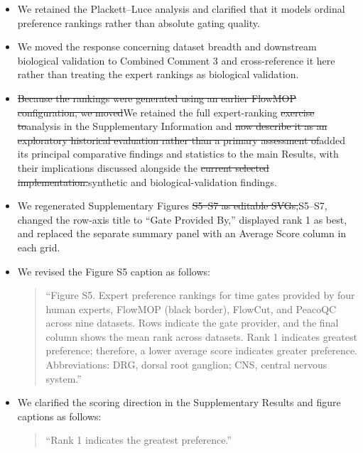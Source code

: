 \documentclass[
  11pt,
  a4paper,
]{article}
\begin{document}
\begin{itemize}
\item
  We retained the Plackett--Luce analysis and clarified that it models
  ordinal preference rankings rather than absolute gating quality.
\item
  We moved the response concerning dataset breadth and downstream
  biological validation to Combined Comment 3 and cross-reference it
  here rather than treating the expert rankings as biological
  validation.
\item
  {\color{revisionred}\sout{Because the rankings were generated using an
  earlier FlowMOP configuration, we moved}}{\color{revisionblue}We
  retained} the {\color{revisionblue}full} expert-ranking
  {\color{revisionred}\sout{exercise to}}{\color{revisionblue}analysis
  in} the Supplementary Information and {\color{revisionred}\sout{now
  describe it as an exploratory historical evaluation rather than a
  primary assessment of}}{\color{revisionblue}added its principal
  comparative findings and statistics to the main Results, with their
  implications discussed alongside} the
  {\color{revisionred}\sout{current selected
  implementation.}}{\color{revisionblue}synthetic and
  biological-validation findings.}
\item
  We regenerated Supplementary Figures {\color{revisionred}\sout{S5--S7
  as editable SVGs,}}{\color{revisionblue}S5--S7,} changed the row-axis
  title to ``Gate Provided By,'' displayed rank 1 as best, and replaced
  the separate summary panel with an Average Score column in each grid.
\item
  We revised the Figure S5 caption as follows:

  \begin{quote}
  ``Figure S5. Expert preference rankings for time gates provided by
  four human experts, FlowMOP (black border), FlowCut, and PeacoQC
  across nine datasets. Rows indicate the gate provider, and the final
  column shows the mean rank across datasets. Rank 1 indicates greatest
  preference; therefore, a lower average score indicates greater
  preference. Abbreviations: DRG, dorsal root ganglion; CNS, central
  nervous system.''
  \end{quote}
\item
  We clarified the scoring direction in the
  {\color{revisionblue}Supplementary} Results {\color{revisionblue}and
  figure captions} as follows:

  \begin{quote}
  ``Rank 1 indicates the greatest preference.''
  \end{quote}
\end{itemize}
\end{document}
